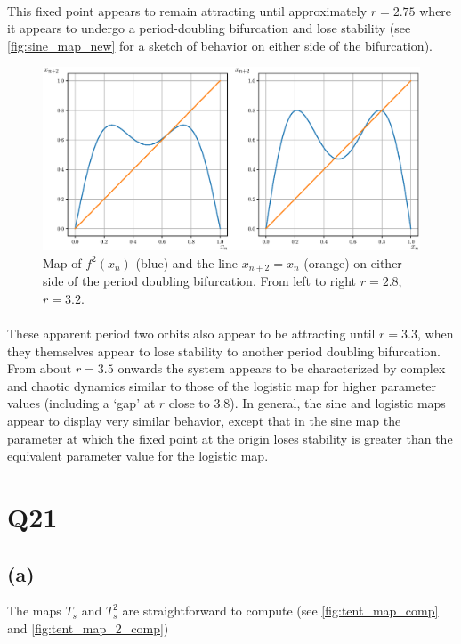 \documentclass{article}
\begin{document}
\paragraph{}
This fixed point appears to remain attracting until approximately $r = 2.75$ where it appears to 
undergo a period-doubling bifurcation and lose stability (see \autoref{fig:sine_map_new} for a sketch 
of behavior on either side of the bifurcation).

\begin{figure}[H]
    \centering
    \includegraphics[scale = 0.65]{Figure_Sine_New.eps}
	\caption{Map of $f^2(x_n)$ (blue) and the line $x_{n+2} = x_n$ (orange) on either side of the period doubling 
    bifurcation. From left to 
    right $r = 2.8$, $r= 3.2$.}
    \label{fig:sine_map_new}
\end{figure}

\paragraph{}
These apparent period two orbits also appear 
to be attracting until $r = 3.3$, when they themselves appear to lose stability to another period 
doubling bifurcation. From about $r = 3.5$ 
onwards the system appears to be characterized by complex and chaotic dynamics similar to those 
of the logistic map for higher parameter values (including a `gap' at $r$ close to 3.8). In general, 
the sine and logistic maps appear to display very similar behavior, except that in the sine map 
the parameter at which the fixed point at the origin loses stability is greater than the equivalent 
parameter value for the logistic map. 

\section*{Q21}
\subsection*{(a)}
The maps $T_s$ and $T^2_s$ are straightforward to compute (see \autoref{fig:tent_map_comp} and 
\autoref{fig:tent_map_2_comp})
\end{document}
